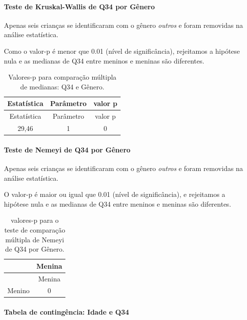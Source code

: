 \documentclass[]{article}
\let\oldparagraph\paragraph
\renewcommand{\paragraph}[1]{\oldparagraph{#1}\mbox{}}
\begin{document}
\hypertarget{teste-de-kruskal-wallis-de-q34-por-guxeanero}{%
\paragraph{Teste de Kruskal-Wallis de Q34 por Gênero}\label{teste-de-kruskal-wallis-de-q34-por-guxeanero}}

Apenas seis crianças se identificaram com o gênero \emph{outros} e foram removidas na análise estatística.

Como o valor-p é menor que 0.01 (nível de significância), rejeitamos a hipótese nula e as medianas de Q34 entre meninos e meninas são diferentes.

\begin{longtable}[]{@{}ccc@{}}
\caption{\label{tab:unnamed-chunk-1209}Valores-p para comparação múltipla de medianas: Q34 e Gênero.}\tabularnewline
\toprule
Estatística & Parâmetro & valor p\tabularnewline
\midrule
\endfirsthead
\toprule
Estatística & Parâmetro & valor p\tabularnewline
\midrule
\endhead
29,46 & 1 & 0\tabularnewline
\bottomrule
\end{longtable}

\hypertarget{teste-de-nemeyi-de-q34-por-guxeanero}{%
\paragraph{Teste de Nemeyi de Q34 por Gênero}\label{teste-de-nemeyi-de-q34-por-guxeanero}}

Apenas seis crianças se identificaram com o gênero \emph{outros} e foram removidas na análise estatística.

O valor-p é maior ou igual que 0.01 (nível de significância), e rejeitamos a hipótese nula e as medianas de Q34 entre meninos e meninas são diferentes.

\begin{longtable}[]{@{}lc@{}}
\caption{\label{tab:unnamed-chunk-1211}valores-p para o teste de comparação múltipla de Nemeyi de Q34 por Gênero.}\tabularnewline
\toprule
& Menina\tabularnewline
\midrule
\endfirsthead
\toprule
& Menina\tabularnewline
\midrule
\endhead
Menino & 0\tabularnewline
\bottomrule
\end{longtable}

\cleardoublepage

\hypertarget{tabela-de-continguxeancia-idade-e-q34}{%
\paragraph{Tabela de contingência: Idade e Q34}\label{tabela-de-continguxeancia-idade-e-q34}}
\end{document}
